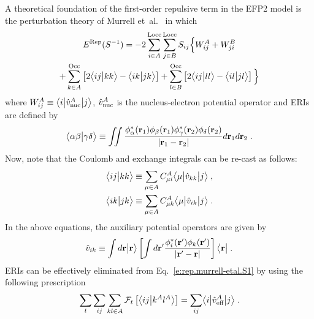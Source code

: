 A theoretical foundation of the
first\hyp{}order repulsive term in the EFP2 model
is the perturbation theory of
Murrell et~al.~\cite{Murrell.Randic.Williams.Longuet-Higgins.ProcRSocLondA.1965} 
in which
%
\begin{multline} \label{e:rep.murrell-etal.S1}
    E^{\rm Rep}(S^{-1}) = -2\sum_{i\in A}^{\rm Locc} \sum_{j\in B}^{\rm Locc}
               S_{ij} \Big\{
           W^A_{ij} 
         + W^B_{ji} \\
 + \sum_{k\in A}^{\rm Occ} \left[ 2\BraKet{ij}{kk} - \BraKet{ik}{jk} \right] 
 + \sum_{l\in B}^{\rm Occ} \left[ 2\BraKet{ij}{ll} - \BraKet{il}{jl} \right]
                \Big\}
\end{multline}
%
where $W^A_{ij} \equiv \tBraKet{i}{\hat{v}^A_{\rm nuc}}{j}$,
$\hat{v}^A_{\rm nuc}$
is the nucleus\hyp{}electron potential operator
and
ERIs are defined by
%
\begin{equation} \label{e:eri}
	\BraKet{\alpha\beta}{\gamma\delta} \equiv
	\iint 
	\frac{ \phi_\alpha^{*}({\bf r}_1) \phi_\beta({\bf r}_1) 
	       \phi_\gamma^{*}({\bf r}_2) \phi_\delta({\bf r}_2) }{ \vert {\bf r}_1 - {\bf r}_2 \vert}
	d{\bf r}_1 d{\bf r}_2  \;.
\end{equation}
%
Now, note that the Coulomb and exchange integrals can be re\hyp{}cast as follows:
%
\begin{subequations}
 \begin{align}
 \BraKet{ij}{kk} &\equiv \sum_{\mu\in A} 
     C_{\mu i}^A \tBraKet{\mu}{\hat{v}_{kk}}{j} \;, \\
 \BraKet{ik}{jk} &\equiv \sum_{\mu\in A} 
     C_{\mu k}^A \tBraKet{\mu}{\hat{v}_{ik}}{j} \;.
 \end{align}
\end{subequations}
%
%
%
In the above equations, the auxiliary potential operators are given by
%
\begin{equation}
  \hat{v}_{ik} \equiv \int d{\bf r} \Ket{{\bf r}} 
        \left[
        \int d{\bf r}' \frac{\phi_i^{*}({\bf r}') \phi_k({\bf r}')}{\vert {\bf r}' - {\bf r}\vert}
        \right] \Bra{{\bf r}} \;.
\end{equation}
%
ERIs can be effectively eliminated from Eq.~\eqref{e:rep.murrell-etal.S1} 
by using the following prescription~\cite{Blasiak.Bednarska.Choluj.Bartkowiak.JCP.2019}
%
\begin{equation} \label{e:ft-reduction}
	\sum_t \sum_{ij}\sum_{kl\in A} {\mathcal{F}}_t\left[ 
   \BraKet{ij}{k^Al^A}
 \right] = \sum_{ij} \tBraKet{i}{\hat{v}_{\text{eff}}^A}{j} \;.
\end{equation}
